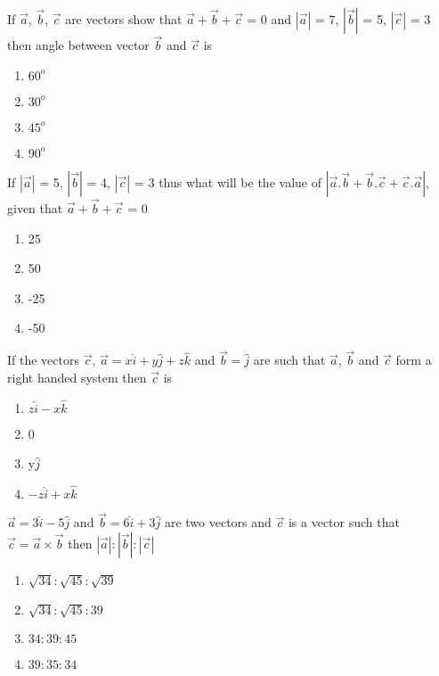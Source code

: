 \item If $\overrightarrow{a}$, $\overrightarrow{b}$, $\overrightarrow{c}$ are vectors show that $\overrightarrow{a} + \overrightarrow{b} + \overrightarrow{c}$ = 0 and $|\overrightarrow{a}|$ = 7, $|\overrightarrow{b}|$ = 5, 
$|\overrightarrow{c}|$ = 3 then angle between vector $\overrightarrow{b}$ and $\overrightarrow{c}$ is
\begin{enumerate}
\item $60^{o}$
\item $30^{o}$
\item $45^{o}$
\item $90^{o}$
\end{enumerate}

\item If $|\overrightarrow{a}|$ = 5, $|\overrightarrow{b}|$ = 4, $|\overrightarrow{c}|$ = 3 thus what will be the value of 
$|\overrightarrow{a}.\overrightarrow{b} + \overrightarrow{b}.\overrightarrow{c} + \overrightarrow{c}.\overrightarrow{a}|$, given that $\overrightarrow{a} + \overrightarrow{b} + \overrightarrow{c}$ = 0
\begin{enumerate}
\item 25
\item 50
\item -25
\item -50
\end{enumerate}

\item If the vectors $\overrightarrow{c}$, $\overrightarrow{a} = x\hat{i} + y\hat{j} + z\hat{k}$ and $\overrightarrow{b} = \hat{j}$ are such that $\overrightarrow{a}$, $\overrightarrow{b}$ and $\overrightarrow{c}$ form a right handed system then $\overrightarrow{c}$ is
\begin{enumerate}
\item $z\hat{i} - x\hat{k}$
\item 0
\item y$\hat{j}$
\item $-z\hat{i} + x\hat{k}$
\end{enumerate}

\item $\overrightarrow{a}=3\hat{i}-5\hat{j}$ and $\overrightarrow{b}=6\hat{i}+3\hat{j}$ are two vectors and $\overrightarrow{c}$ is a vector such that $\overrightarrow{c}=\overrightarrow{a} \times \overrightarrow{b}$ then 
$|\overrightarrow{a}|:|\overrightarrow{b}|:|\overrightarrow{c}|$
\begin{enumerate}
\item $\sqrt{34}:\sqrt{45}:\sqrt{39}$
\item $\sqrt{34}:\sqrt{45}:39$
\item $34:39:45$
\item $39:35:34$
\end{enumerate}

